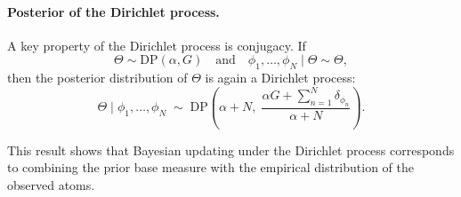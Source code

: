 \paragraph{Posterior of the Dirichlet process.}
A key property of the Dirichlet process is conjugacy.
If
\[
\Theta \sim \mathrm{DP}(\alpha, G)
\quad\text{and}\quad
\phi_1,\ldots,\phi_N \mid \Theta \sim \Theta,
\]
then the posterior distribution of $\Theta$ is again a Dirichlet process:
\[
\Theta \mid \phi_1,\ldots,\phi_N
\;\sim\;
\mathrm{DP}\!\left(
\alpha + N,\;
\frac{\alpha G + \sum_{n=1}^N \delta_{\phi_n}}{\alpha + N}
\right).
\]

This result shows that Bayesian updating under the Dirichlet process corresponds to combining the prior base measure with the empirical distribution of the observed atoms.

